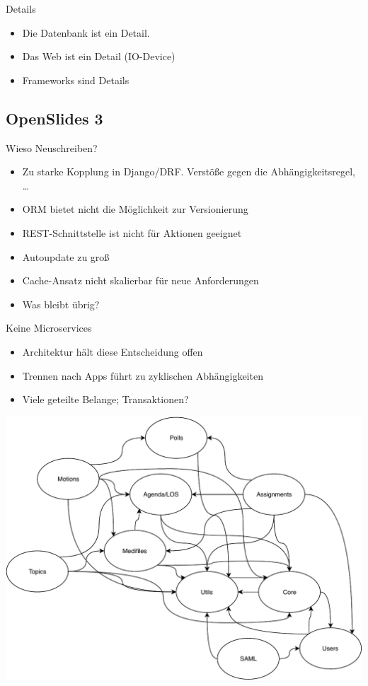 \documentclass[10pt]{beamer}
\begin{document}
\begin{frame}{Details}
	\begin{itemize}
		\item Die Datenbank ist ein Detail.
		\item Das Web ist ein Detail (IO-Device)
		\item Frameworks sind Details
	\end{itemize}
\end{frame}

\subsection{OpenSlides 3}
\begin{frame}{Wieso Neuschreiben?}
	\begin{itemize}
		\item Zu starke Kopplung in Django/DRF. Verstöße gegen die Abhängigkeitsregel, \ldots
		\item ORM bietet nicht die Möglichkeit zur Versionierung
		\item REST-Schnittstelle ist nicht für Aktionen geeignet
		\item Autoupdate zu groß
		\item Cache-Ansatz nicht skalierbar für neue Anforderungen
		\item<2-> Was bleibt übrig?
	\end{itemize}
\end{frame}
\begin{frame}{Keine Microservices}
	\begin{itemize}
		\item Architektur hält diese Entscheidung offen
		\item Trennen nach Apps führt zu zyklischen Abhängigkeiten
		\item Viele geteilte Belange; Transaktionen?
	\end{itemize}
	\includegraphics[scale=0.5]{os3-modelle}
\end{frame}
\end{document}
